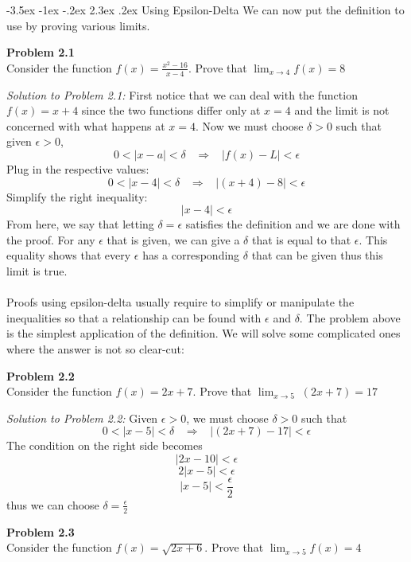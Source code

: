 \documentclass[11pt]{scrartcl}
\makeatletter
\renewcommand\section{\@startsection{section}{1}{\z@}%
                                   {-3.5ex \@plus -1ex \@minus -.2ex}%
                                   {2.3ex \@plus.2ex}%
                                   {\normalfont\large\bfseries}}
\makeatother
\begin{document}
\section{Using Epsilon-Delta}
\noindent
We can now put the definition to use by proving various limits.\\
\begin{tcolorbox}
\textbf{Problem 2.1}\\
Consider the function $f(x)=\frac{x^2-16}{x-4}$. Prove that $\lim_{x \to 4} f(x)=8$
\end{tcolorbox}
\noindent
\textit{Solution to Problem 2.1:} First notice that we can deal with the function $f(x)=x+4$ since the two functions differ only at $x=4$ and the limit is not concerned with what happens at $x=4$. Now we must choose $\delta>0$ such that given $\epsilon>0$,
$$0<\lvert x-a \rvert<\delta \;\;\;\Longrightarrow\;\;\; \lvert f(x)-L\rvert<\epsilon$$
\noindent
Plug in the respective values:
$$0<\lvert x-4 \rvert<\delta \;\;\;\Longrightarrow\;\;\; \lvert (x+4)-8\rvert<\epsilon$$
Simplify the right inequality:
$$\lvert x-4 \rvert<\epsilon$$
From here, we say that letting $\delta=\epsilon$ satisfies the definition and we are done with the proof. For any $\epsilon$ that is given, we can give a $\delta$ that is equal to that $\epsilon$. This equality shows that every $\epsilon$ has a corresponding $\delta$ that can be given thus this limit is true. \\
\noindent\\
Proofs using epsilon-delta usually require to simplify or manipulate the inequalities so that a relationship can be found with $\epsilon$ and $\delta$. The problem above is the simplest application of the definition. We will solve some complicated ones where the answer is not so clear-cut:\\
\begin{tcolorbox}
\textbf{Problem 2.2}\\
Consider the function $f(x)=2x+7$. Prove that $\lim_{x \to 5}\; (2x+7)=17$ 
\end{tcolorbox}
\noindent
\textit{Solution to Problem 2.2:} Given $\epsilon>0$, we must choose $\delta>0$ such that 
$$0<\lvert x-5 \rvert<\delta \;\;\;\Longrightarrow\;\;\; \lvert (2x+7)-17 \rvert<\epsilon$$
The condition on the right side becomes 
$$\lvert 2x-10 \rvert<\epsilon$$  $$2\lvert x-5 \rvert<\epsilon$$
$$\vert x-5 \rvert<\frac{\epsilon}{2}$$
thus we can choose $\delta=\frac{\epsilon}{2}$\\
\begin{tcolorbox}
\textbf{Problem 2.3}\\
Consider the function $f(x)=\sqrt{2x+6}$. Prove that $\lim_{x \to 5} f(x)=4$
\end{tcolorbox}
\end{document}
